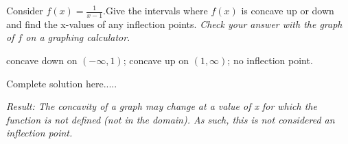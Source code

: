 \vspace{3in}
\begin{example}
Consider $f(x)=\displaystyle\frac{1}{x-1}$.Give the intervals where $f(x)$ is concave up or down and find the x-values of any inflection points. \emph{Check your answer with the graph of $f$ on a graphing calculator}.\footnotemark[\value{footnote}]
    \begin{sol}
    concave down on $(-\infty,1)$; concave up on $(1,\infty)$; no inflection point.
    \end{sol}
    \begin{solL}
    Complete solution here.....
    
    \end{solL}
    
\end{example}
\vspace*{\fill}
\noindent \emph{Result: The concavity of a graph may change at a value of x for which the function is not defined (not in the domain).  As such, this is not considered an inflection point. }


